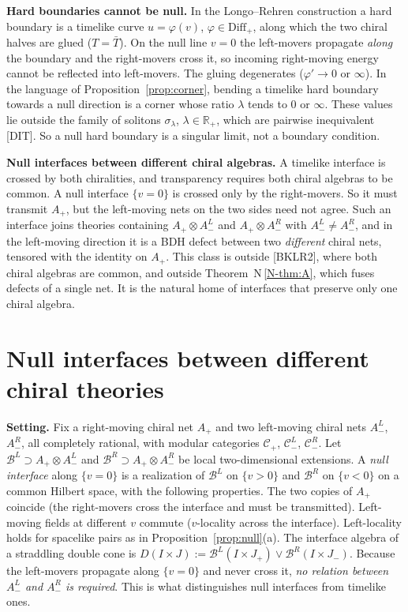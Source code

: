 \documentclass[11pt]{article}
\theoremstyle{definition}
\theoremstyle{remark}
\newcommand{\cB}{\mathcal B}
\newcommand{\nref}[1]{N\,\ref{N-#1}}
\begin{document}
\textbf{Hard boundaries cannot be null.} In the Longo--Rehren construction a hard boundary is a timelike curve $u=\varphi(v)$, $\varphi\in\mathrm{Diff}_+$, along which the two chiral halves are glued ($T=\bar T$). On the null line $v=0$ the left-movers propagate \emph{along} the boundary and the right-movers cross it, so incoming right-moving energy cannot be reflected into left-movers. The gluing degenerates ($\varphi'\to0$ or $\infty$). In the language of Proposition~\ref{prop:corner}, bending a timelike hard boundary towards a null direction is a corner whose ratio $\lambda$ tends to $0$ or $\infty$. These values lie outside the family of solitons $\sigma_\lambda$, $\lambda\in\mathbb R_+$, which are pairwise inequivalent [DIT]. So a null hard boundary is a singular limit, not a boundary condition.

\textbf{Null interfaces between different chiral algebras.} A timelike interface is crossed by both chiralities, and transparency requires both chiral algebras to be common. A null interface $\{v=0\}$ is crossed only by the right-movers. So it must transmit $A_+$, but the left-moving nets on the two sides need not agree. Such an interface joins theories containing $A_+\otimes A^L_-$ and $A_+\otimes A^R_-$ with $A^L_-\ne A^R_-$, and in the left-moving direction it is a BDH defect between two \emph{different} chiral nets, tensored with the identity on $A_+$. This class is outside [BKLR2], where both chiral algebras are common, and outside Theorem~\nref{thm:A}, which fuses defects of a single net. It is the natural home of interfaces that preserve only one chiral algebra.

\section{Null interfaces between different chiral theories}\label{sec:nullint}
\textbf{Setting.} Fix a right-moving chiral net $A_+$ and two left-moving chiral nets $A^L_-$, $A^R_-$, all completely rational, with modular categories $\mathcal C_+$, $\mathcal C^L_-$, $\mathcal C^R_-$. Let $\cB^L\supset A_+\otimes A^L_-$ and $\cB^R\supset A_+\otimes A^R_-$ be local two-dimensional extensions. A \emph{null interface} along $\{v=0\}$ is a realization of $\cB^L$ on $\{v>0\}$ and $\cB^R$ on $\{v<0\}$ on a common Hilbert space, with the following properties. The two copies of $A_+$ coincide (the right-movers cross the interface and must be transmitted). Left-moving fields at different $v$ commute ($v$-locality across the interface). Left-locality holds for spacelike pairs as in Proposition~\ref{prop:null}(a). The interface algebra of a straddling double cone is $D(I\times J):=\cB^L(I\times J_+)\vee\cB^R(I\times J_-)$. Because the left-movers propagate along $\{v=0\}$ and never cross it, \emph{no relation between $A^L_-$ and $A^R_-$ is required}. This is what distinguishes null interfaces from timelike ones.
\end{document}
